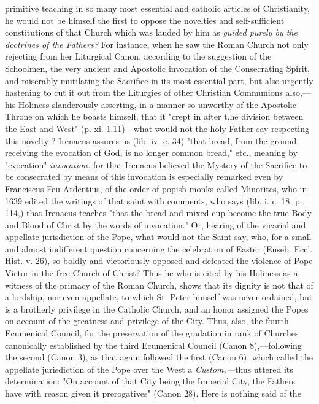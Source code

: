 primitive teaching in so many most essential and catholic articles of
Christianity, he would not be himself the first to oppose the novelties
and self-sufficient constitutions of that Church which was lauded by him
as \emph{guided purely by the doctrines of the Fathers?} For instance,
when he saw the Roman Church not only rejecting from her Liturgical
Canon, according to the suggestion of the Schoolmen, the very ancient
and Apostolic invocation of the Consecrating Spirit, and miserably
mutilating the Sacrifice in its most essential part, but also urgently
hastening to cut it out from the Liturgies of other Christian Communions
also,---his Holiness slanderously asserting, in a manner so unworthy of
the Apostolic Throne on which he boasts himself, that it "crept in after
t.he division between the East and West" (p. xi. 1.11)---what would not
the holy Father say respecting this novelty ? Irenaeus assures us (lib.
iv. c. 34) "that bread, from the ground, receiving the evocation of God,
is no longer common bread," etc., meaning by "evocation"
\emph{invocation:} for that Irenaeus believed the Mystery of the
Sacrifice to be consecrated by means of this invocation is especially
remarked even by Franciscus Feu-Ardentius, of the order of popish monks
called Minorites, who in 1639 edited the writings of that saint with
comments, who says (lib. i. c. 18, p. 114,) that Irenaeus teaches "that
the bread and mixed cup become the true Body and Blood of Christ by the
words of invocation." Or, hearing of the vicarial and appellate
jurisdiction of the Pope, what would not the Saint say, who, for a small
and almost indifferent question concerning the celebration of Easter
(Euseb. Eccl. Hist. v. 26), so boldly and victoriously opposed and
defeated the violence of Pope Victor in the free Church of Christ? Thus
he who is cited by his Holiness as a witness of the primacy of the Roman
Church, shows that its dignity is not that of a lordship, nor even
appellate, to which St. Peter himself was never ordained, but is a
brotherly privilege in the Catholic Church, and an honor assigned the
Popes on account of the greatness and privilege of the City. Thus, also,
the fourth Ecumenical Council, for the preservation of the gradation in
rank of Churches canonically established by the third Ecumenical Council
(Canon 8),---following the second (Canon 3), as that again followed the
first (Canon 6), which called the appellate jurisdiction of the Pope
over the West a \emph{Custom,---}thus uttered its determination: "On
account of that City being the Imperial City, the Fathers have with
reason given it prerogatives" (Canon 28). Here is nothing said of the
